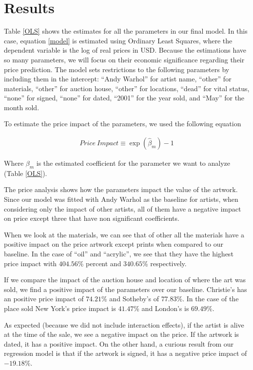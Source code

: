 \documentclass[]{asaproc}\usepackage[]{graphicx}\usepackage[]{color}
\begin{document}
\section{Results}

Table \ref{OLS} shows the estimates for all the parameters in our final model. In this case, equation \ref{model} is estimated using Ordinary Least Squares, where the dependent variable is the log of real prices in USD. Because the estimations have so many parameters, we will focus on their economic significance regarding their price prediction. The model sets restrictions to the following parameters by including them in the intercept: ``Andy Warhol'' for artist name, ``other'' for materials, ``other'' for auction house, ``other'' for locations, ``dead'' for vital status, ``none'' for signed, ``none'' for dated, ``2001'' for the year sold, and ``May'' for the month sold. 

To estimate the price impact of the parameters, we used the following equation

\begin{align}
Price\ Impact \equiv \exp(\hat\beta_m) - 1
\label{impact}
\end{align}

Where $\beta_m$ is the estimated coefficient for the parameter we want to analyze (Table \ref{OLS}).

The price analysis shows how the parameters impact the value of the artwork. Since our model was fitted with Andy Warhol as the baseline for artists, when considering only the impact of other artists, all of them have a negative impact on price except three that have non significant coefficients.

When we look at the materials, we can see that of other all the materials have a positive impact on the price artwork except prints when compared to our baseline. In the case of ``oil'' and ``acrylic'', we see that they have the highest price impact with $404.56$\% percent and $340.65$\% respectively.

If we compare the impact of the auction house and location of where the art was sold, we find a positive impact of the parameters over our baseline. Christie's has an positive price impact of $74.21$\% and Sotheby's of $77.83$\%. In the case of the place sold New York's price impact is $41.47$\% and London's is $69.49$\%.

As expected (because we did not include interaction effects), if the artist is alive at the time of the sale, we see a negative impact on the price. If the artwork is dated, it has a positive impact. On the other hand, a curious result from our regression model is that if the artwork is signed, it has a negative price impact of $-19.18$\%.
\end{document}
